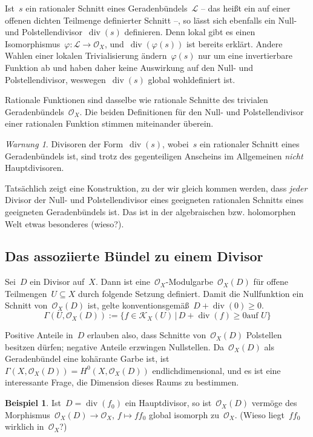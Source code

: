 \documentclass[a4paper,ngerman,12pt]{scrartcl}
\theoremstyle{definition}
\newtheorem{ex}[defn]{Beispiel}
\theoremstyle{plain}
\theoremstyle{remark}
\newtheorem{warning}[defn]{Warnung}
\newcommand{\K}{\mathcal{K}}
\renewcommand{\L}{\mathcal{L}}
\renewcommand{\O}{\mathcal{O}}
\renewcommand{\div}{\operatorname{div}}
\begin{document}
Ist~$s$ ein rationaler Schnitt eines Geradenbündels~$\L$ -- das heißt ein auf
einer offenen dichten Teilmenge definierter Schnitt --, so lässt sich ebenfalls
ein Null- und Polstellendivisor~$\div(s)$ definieren. Denn lokal gibt es einen
Isomorphismus~$\varphi : \L \to \O_X$, und~$\div(\varphi(s))$ ist bereits
erklärt. Andere Wahlen einer lokalen Trivialisierung ändern~$\varphi(s)$ nur um
eine invertierbare Funktion ab und haben daher keine Auswirkung auf den Null-
und Polstellendivisor, weswegen~$\div(s)$ global wohldefiniert ist.

Rationale Funktionen sind dasselbe wie rationale Schnitte des trivialen
Geradenbündels~$\O_X$. Die beiden Definitionen für den Null- und
Polstellendivisor einer rationalen Funktion stimmen miteinander überein.

\begin{warning}Divisoren der Form~$\div(s)$, wobei~$s$ ein rationaler Schnitt
eines Geradenbündels ist, sind trotz des gegenteiligen Anscheins im
Allgemeinen \emph{nicht} Hauptdivisoren.\end{warning}

Tatsächlich zeigt eine Konstruktion, zu der wir gleich kommen werden, dass
\emph{jeder} Divisor der Null- und Polstellendivisor eines geeigneten rationalen Schnitts
eines geeigneten Geradenbündels ist. Das ist in der algebraischen bzw.
holomorphen Welt etwas besonderes (wieso?).


\subsection*{Das assoziierte Bündel zu einem Divisor}

\begin{defn}Sei~$D$ ein Divisor auf~$X$. Dann ist
eine~$\O_X$-Modulgarbe~$\O_X(D)$ für offene Teilmengen~$U \subseteq X$ durch
folgende Setzung definiert. Damit die Nullfunktion ein Schnitt von~$\O_X(D)$
ist, gelte konventionsgemäß~$D + \div(0) \geq 0$.
\[ \Gamma(U, \O_X(D)) := \{ f \in \K_X(U) \,|\, \text{$D + \div(f) \geq 0$
auf~$U$} \} \]
\end{defn}

Positive Anteile in~$D$ erlauben also, dass Schnitte von~$\O_X(D)$ Polstellen
besitzen dürfen; negative Anteile erzwingen Nullstellen. Da~$\O_X(D)$ als
Geradenbündel eine kohärante Garbe ist, ist~$\Gamma(X,\O_X(D)) =
H^0(X,\O_X(D))$ endlichdimensional, und es ist eine interessante Frage, die
Dimension dieses Raums zu bestimmen.

\begin{ex}\label{ex:o-hauptdivisor}
Ist~$D = \div(f_0)$ ein Hauptdivisor, so ist~$\O_X(D)$ vermöge des
Morphismus~$\O_X(D) \to \O_X$, $f \mapsto f f_0$ global isomorph zu~$\O_X$.
(Wieso liegt~$f f_0$ wirklich in~$\O_X$?)\end{ex}
\end{document}
